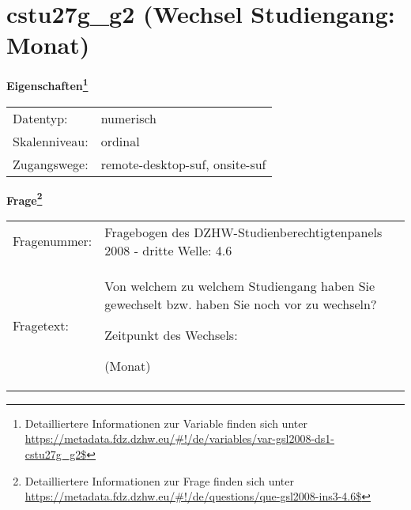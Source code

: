 
    \setcounter{footnote}{0}

    \vspace*{-1.8cm}
	\section{cstu27g\_g2 (Wechsel Studiengang: Monat)}
	\label{section:cstu27g_g2}



    \vspace*{0.5cm}
    \noindent\textbf{Eigenschaften\footnote{Detailliertere Informationen zur Variable finden sich unter
		\url{https://metadata.fdz.dzhw.eu/\#!/de/variables/var-gsl2008-ds1-cstu27g_g2$}}}\\
	\begin{tabularx}{\hsize}{@{}lX}
	Datentyp: & numerisch \\
	Skalenniveau: & ordinal \\
	Zugangswege: &
	  remote-desktop-suf, 
	  onsite-suf
 \\
    \end{tabularx}



				\vspace*{0.5cm}
                \noindent\textbf{Frage\footnote{Detailliertere Informationen zur Frage finden sich unter
		              \url{https://metadata.fdz.dzhw.eu/\#!/de/questions/que-gsl2008-ins3-4.6$}}}\\
				\begin{tabularx}{\hsize}{@{}lX}
					Fragenummer: &
					  Fragebogen des DZHW-Studienberechtigtenpanels 2008 - dritte Welle:
					  4.6
 \\
					Fragetext: & Von welchem zu welchem Studiengang haben Sie gewechselt bzw. haben Sie noch vor zu wechseln?\par  Zeitpunkt des Wechsels:\par  (Monat) \\
				\end{tabularx}





